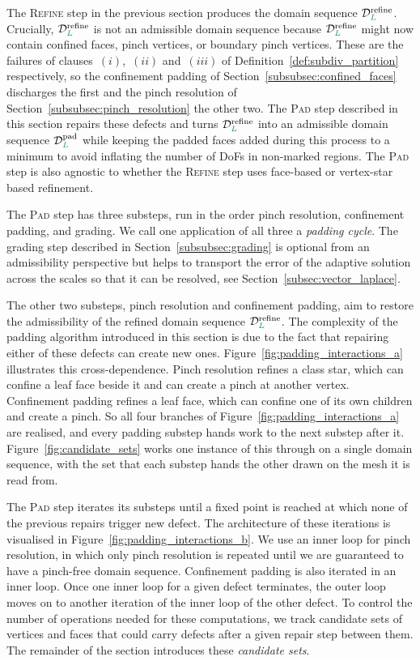 \documentclass[a4paper, 12pt]{article}
\makeatletter
\newcommand{\green}{\color{ForestGreen}}
\renewcommand{\L}{{\green L}}
\theoremstyle{definition}
\theoremstyle{plain}
\numberwithin{equation}{section}
\DeclareRobustCommand{\domseq}[1][]{\mathcal{D}\ifx\@empty#1\@empty\else_{#1}\fi}
\makeatother
\begin{document}
The \textsc{Refine} step in the previous section produces the domain sequence $\domseq[\L]^{\mathrm{refine}}$. Crucially, $\domseq[\L]^{\mathrm{refine}}$ is not an admissible domain sequence because $\domseq[\L]^{\mathrm{refine}}$ might now contain confined faces, pinch vertices, or boundary pinch vertices. These are the failures of clauses~$(i)$,~$(ii)$ and~$(iii)$ of Definition~\ref{def:subdiv_partition} respectively, so the confinement padding of Section~\ref{subsubsec:confined_faces} discharges the first and the pinch resolution of Section~\ref{subsubsec:pinch_resolution} the other two. The \textsc{Pad} step described in this section repairs these defects and turns $\domseq[\L]^{\mathrm{refine}}$ into an admissible domain sequence $\domseq[\L]^{\mathrm{pad}}$ while keeping the padded faces added during this process to a minimum to avoid inflating the number of DoFs in non-marked regions. The \textsc{Pad} step is also agnostic to whether the \textsc{Refine} step uses face-based or vertex-star based refinement.

The \textsc{Pad} step has three substeps, run in the order pinch resolution, confinement padding, and grading. We call one application of all three a \emph{padding cycle}. The grading step described in Section~\ref{subsubsec:grading} is optional from an admissibility perspective but helps to transport the error of the adaptive solution across the scales so that it can be resolved, see Section~\ref{subsec:vector_laplace}.

The other two substeps, pinch resolution and confinement padding, aim to restore the admissibility of the refined domain sequence $\domseq[\L]^{\mathrm{refine}}$. The complexity of the padding algorithm introduced in this section is due to the fact that repairing either of these defects can create new ones. Figure~\ref{fig:padding_interactions_a} illustrates this cross-dependence. Pinch resolution refines a class star, which can confine a leaf face beside it and can create a pinch at another vertex. Confinement padding refines a leaf face, which can confine one of its own children and create a pinch. So all four branches of Figure~\ref{fig:padding_interactions_a} are realised, and every padding substep hands work to the next substep after it. Figure~\ref{fig:candidate_sets} works one instance of this through on a single domain sequence, with the set that each substep hands the other drawn on the mesh it is read from.

The \textsc{Pad} step iterates its substeps until a fixed point is reached at which none of the previous repairs trigger new defect. The architecture of these iterations is visualised in Figure~\ref{fig:padding_interactions_b}. We use an inner loop for pinch resolution, in which only pinch resolution is repeated until we are guaranteed to have a pinch-free domain sequence. Confinement padding is also iterated in an inner loop. Once one inner loop for a given defect terminates, the outer loop moves on to another iteration of the inner loop of the other defect. To control the number of operations needed for these computations, we track candidate sets of vertices and faces that could carry defects after a given repair step between them. The remainder of the section introduces these \emph{candidate sets}.
\end{document}
